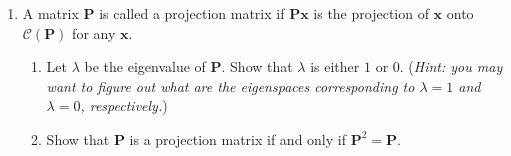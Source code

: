 \documentclass[11pt,letter,notitlepage]{article}
\begin{document}
\begin{exercise}
\begin{enumerate}
\begin{enumerate}
\begin{enumerate}
		            \end{enumerate}
	        \end{enumerate}
	   \item A matrix $\mathbf{P}$ is called a projection matrix if $\mathbf{P}\mathbf{x}$ is the projection of $\mathbf{x}$ onto $\mathcal{C}(\mathbf{P})$ for any $\mathbf{x}$.
	        \begin{enumerate}
	            \item Let $\lambda$ be the eigenvalue of $\mathbf{P}$. Show that $\lambda$ is either $1$ or $0$. (\emph{Hint: you may want to figure out what are the eigenspaces corresponding to $\lambda=1$ and $\lambda=0$, respectively.})
	            \item Show that $\mathbf{P}$ is a projection matrix if and only if $\mathbf{P}^2 = \mathbf{P}$.
	        \end{enumerate}
	\end{enumerate}
\end{exercise}
\end{document}

